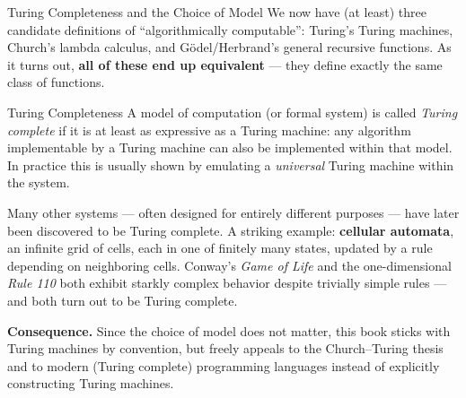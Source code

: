 \documentclass[aspectratio=169,10pt]{beamer}
\begin{document}
\begin{frame}{Turing Completeness and the Choice of Model}
  We now have (at least) three candidate definitions of ``algorithmically
  computable'': Turing's Turing machines, Church's lambda calculus, and
  Gödel/Herbrand's general recursive functions. As it turns out, \textbf{all
  of these end up equivalent} --- they define exactly the same class of
  functions.

  \begin{block}{Turing Completeness}
    A model of computation (or formal system) is called \emph{Turing complete}
    if it is at least as expressive as a Turing machine: any algorithm
    implementable by a Turing machine can also be implemented within that
    model. In practice this is usually shown by emulating a \emph{universal}
    Turing machine within the system.
  \end{block}

  Many other systems --- often designed for entirely different purposes ---
  have later been discovered to be Turing complete. A striking example:
  \textbf{cellular automata}, an infinite grid of cells, each in one of
  finitely many states, updated by a rule depending on neighboring cells.
  Conway's \emph{Game of Life} and the one-dimensional \emph{Rule 110} both
  exhibit starkly complex behavior despite trivially simple rules --- and both
  turn out to be Turing complete.

  \vspace{2mm}
  \textbf{Consequence.} Since the choice of model does not matter, this book
  sticks with Turing machines by convention, but freely appeals to the
  Church--Turing thesis and to modern (Turing complete) programming languages
  instead of explicitly constructing Turing machines.
\end{frame}
\end{document}
